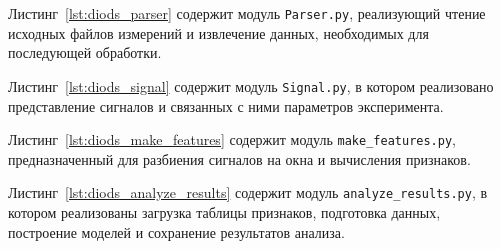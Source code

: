Листинг~\ref{lst:diods_parser} содержит модуль \texttt{Parser.py}, реализующий чтение исходных файлов измерений и извлечение данных, необходимых для последующей обработки.



Листинг~\ref{lst:diods_signal} содержит модуль \texttt{Signal.py}, в котором реализовано представление сигналов и связанных с ними параметров эксперимента.



Листинг~\ref{lst:diods_make_features} содержит модуль \texttt{make\_features.py}, предназначенный для разбиения сигналов на окна и вычисления признаков.



Листинг~\ref{lst:diods_analyze_results} содержит модуль \texttt{analyze\_results.py}, в котором реализованы загрузка таблицы признаков, подготовка данных, построение моделей и сохранение результатов анализа.



\endinput